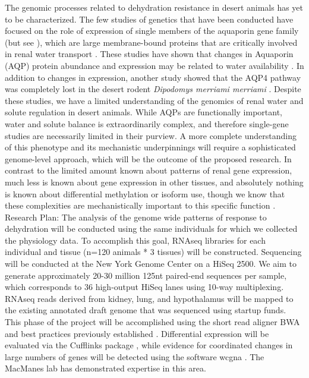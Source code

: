 \documentclass[12pt]{article}
\begin{document}
The genomic processes related to dehydration resistance in desert animals has yet to be characterized. The few studies of genetics that have been conducted have focused on the role of expression of single members of the aquaporin gene family (but see \cite{Bartolo:2007hy}), which are large membrane-bound proteins that are critically involved in renal water transport \citep{Kwon:2009bv,Verkman:2002ww,Brown:1995vo,Nielsen:1995cb}. These studies have shown that changes in Aquaporin (AQP) protein abundance and expression may be related to water availability \citep{Boselt:2009fb, Gallardo:2005fm,Bozinovic:2003eg}. In addition to changes in expression, another study showed that the AQP4 pathway was completely lost in the desert rodent \textit{Dipodomys merriami merriami} \citep{Huang:2001ti}. Despite these studies, we have a limited understanding of the genomics of renal water and solute regulation in desert animals. While AQPs are functionally important, water and solute balance is extraordinarily complex, and therefore single-gene studies are necessarily limited in their purview. A more complete understanding of this phenotype and its mechanistic underpinnings will require a sophisticated genome-level approach, which will be the outcome of the proposed research. In contrast to the limited amount known about patterns of renal gene expression, much less is known about gene expression in other tissues, and absolutely nothing is known about differential methylation or isoform use, though we know that these complexities are mechanistically important to this specific function \citep{Yukutake:2010ia,Silberstein:2004ex}. \\

Research Plan: The analysis of the genome wide patterns of response to dehydration will be conducted using the same individuals for which we collected the physiology data. To accomplish this goal, RNAseq libraries for each individual and tissue (n=120 animals * 3 tissues) will be constructed. Sequencing will be conducted at the New York Genome Center on a HiSeq 2500. We aim to generate approximately 20-30 million 125nt paired-end sequences per sample, which corresponds to 36 high-output HiSeq lanes using 10-way multiplexing. \\ 

RNAseq reads derived from kidney, lung, and hypothalamus will be mapped to the existing annotated draft genome that was sequenced using startup funds. This phase of the project will be accomplished using the short read aligner BWA \citep{Li:2013wn} and best practices previously established \citep{MacManes:2014io}. Differential expression will be evaluated via the Cufflinks package \citep{Trapnell:2012kp}, while evidence for coordinated changes in large numbers of genes will be detected using the software wcgna \citep{Langfelder:2008bd}. The MacManes lab has demonstrated expertise in this area.\\
\end{document}
